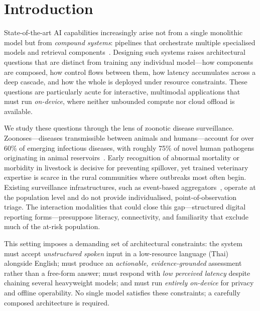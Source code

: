 \documentclass[runningheads]{llncs}
\begin{document}
\begin{abstract}
\end{abstract}
%
\section{Introduction}

State-of-the-art AI capabilities increasingly arise not from a single monolithic model but from \emph{compound systems}: pipelines that orchestrate multiple specialised models and retrieval components~\cite{compoundai}. Designing such systems raises architectural questions that are distinct from training any individual model---how components are composed, how control flows between them, how latency accumulates across a deep cascade, and how the whole is deployed under resource constraints. These questions are particularly acute for interactive, multimodal applications that must run \emph{on-device}, where neither unbounded compute nor cloud offload is available.

We study these questions through the lens of zoonotic disease surveillance. Zoonoses---diseases transmissible between animals and humans---account for over 60\% of emerging infectious diseases, with roughly 75\% of novel human pathogens originating in animal reservoirs~\cite{who_zoonoses}. Early recognition of abnormal mortality or morbidity in livestock is decisive for preventing spillover, yet trained veterinary expertise is scarce in the rural communities where outbreaks most often begin. Existing surveillance infrastructures, such as event-based aggregators~\cite{fao_empres,brownstein2008}, operate at the population level and do not provide individualised, point-of-observation triage. The interaction modalities that could close this gap---structured digital reporting forms---presuppose literacy, connectivity, and familiarity that exclude much of the at-risk population.

This setting imposes a demanding set of architectural constraints: the system must accept \emph{unstructured spoken} input in a low-resource language (Thai) alongside English; must produce an \emph{actionable, evidence-grounded} assessment rather than a free-form answer; must respond with \emph{low perceived latency} despite chaining several heavyweight models; and must run \emph{entirely on-device} for privacy and offline operability. No single model satisfies these constraints; a carefully composed architecture is required.
\end{document}
